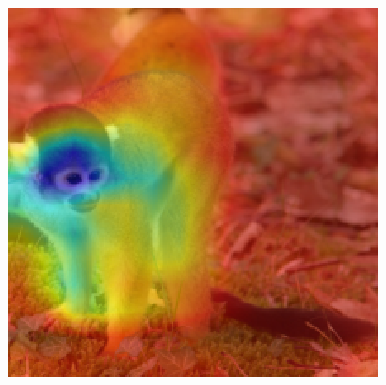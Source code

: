 \documentclass{article}
\begin{document}
\begin{figure}[htb]
{\begin{minipage}{0.3 \textwidth}
\includegraphics[width = 1 \textwidth] {19100_overlap_orig.png}
\label{fig_expl_GT}
\end{minipage}
}
\end{figure}
\end{document}
